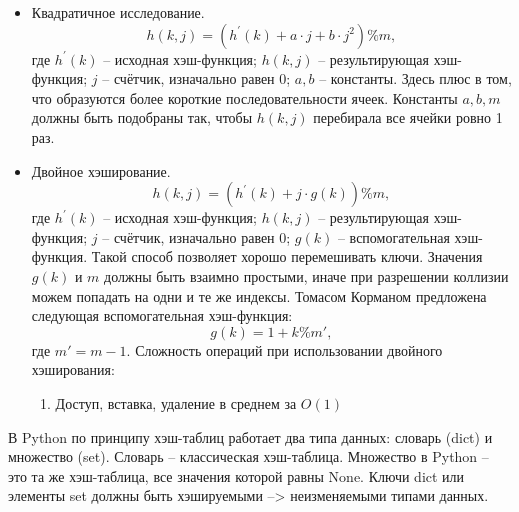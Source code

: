 \documentclass{article}
\begin{document}
\begin{itemize}
\begin{itemize}
        При добавлении нового значения если ячейка занята, то переходим к следующей, увеличивая счётчик $j$ на 1. И так, пока не встретим None.
        При удалении в ячейки оставляем метку 'deleted'. Это надо, чтобы при поиске ключей за удалённым значением, мы не остановили поиск раньше времени.
        Могут образовываться длинные цепочки и неравномерность.
        \item Квадратичное исследование.
        \begin{equation}\label{eq:hash_squad}
            h(k, j) = (h^{'}(k) + a \cdot j + b \cdot j^2) \% m,
        \end{equation}где $h^{'}(k)$ -- исходная хэш-функция; $h(k, j)$ -- результирующая хэш-функция; $j$ -- счётчик, изначально равен 0; $a, b$ -- константы.
        Здесь плюс в том, что образуются более короткие последовательности ячеек. Константы $a, b, m$ должны быть подобраны так, чтобы $h(k, j)$ перебирала все ячейки ровно 1 раз.
        \item Двойное хэширование.
        \begin{equation}\label{eq:hash_double}
            h(k, j) = (h^{'}(k) + j \cdot g(k)) \% m,
        \end{equation}где $h^{'}(k)$ -- исходная хэш-функция; $h(k, j)$ -- результирующая хэш-функция; $j$ -- счётчик, изначально равен 0;
        $g(k)$ -- вспомогательная хэш-функция. Такой способ позволяет хорошо перемешивать ключи.
        Значения $g(k)$ и $m$ должны быть взаимно простыми, иначе при разрешении коллизии можем попадать на одни и те же индексы. Томасом Корманом
        предложена следующая вспомогательная хэш-функция:
        \begin{equation}\label{eq:hash_double_help}
            g(k) = 1 + k \% m',
        \end{equation}где $m' = m - 1$.
        Сложность операций при использовании двойного хэширования:
        \begin{enumerate}
            \item Доступ, вставка, удаление в среднем за $O(1)$
        \end{enumerate}
    \end{itemize}
\end{itemize}


В Python по принципу хэш-таблиц работает два типа данных: словарь (dict) и множество (set). Словарь -- классическая хэш-таблица.
Множество в Python -- это та же хэш-таблица, все значения которой равны None.
Ключи dict или элементы set должны быть хэшируемыми --> неизменяемыми типами данных.
\end{document}
